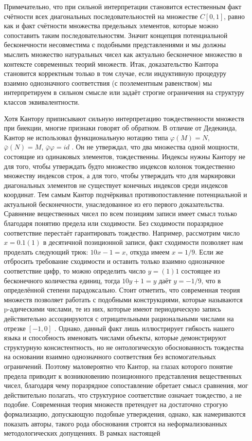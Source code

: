\documentclass[12pt]{article}
\begin{document}
Примечательно, что при сильной интерпретации становится естественным факт счётности всех диагональных последовательностей на множестве $C[0, 1]$, равно как и факт счётности множества предельных элементов, которые можно сопоставить таким последовательностям. Значит концепция потенциальной бесконечности несовместима с подобными представлениями и мы должны мыслить множество натуральных чисел как актуально бесконечное множество в контексте современных теорий множеств. Итак, доказательство Кантора становится корректным только в том случае, если индуктивную процедуру взаимно однозначного соответствия (с поэлементным равенством) мы интерпретируем в сильном смысле или задаёт строгие ограничения на структуру классов эквивалентности.

Хотя Кантору приписывают сильную интерпретацию тождественности множеств при биекции, многие признаки говорят об обратном. В отличие от Дедекинда, Кантор не использовал функциональную нотацию типа $\varphi(M) = N$, $\bar{\varphi}(N) = M$, $\bar{\varphi}\varphi = id$ \cite{cantor-equality, dedekind-equality}. Он не утверждал, что два множества одной мощности, состоящие из одинаковых элементов, тождественны. Индексы нужны Кантору не для того, чтобы утверждать будто множество индексов колонок тождественно множеству индексов строк, а для того, чтобы утверждать что для маркировки диагональных элементов не существует конечных индексов среди индексов координат. Тем самым Кантор подчёркивал противопоставление потенциальной и актуальной бесконечности, унаследованное из его первого доказательства. Сравнение вещественных чисел по всем позициям записи имеет смысл только благодаря понятию предела или сходимости. Без сходимости поразрядное соответствие перестаёт гарантировать тождество. Например, рассмотрим число $x = 0.1(1)$ в десятичной позиционной записи, факт сходимости позволяет нам проделать следующий трюк: $10x - 1 = x$, откуда имеем $x = 1/9$. Если же отбросить требование сходимости и оставить только взаимно однозначное соответствие цифр, то можно определить число $y = (1)1$ состоящее из бесконечного количества единиц, тогда $10y + 1 = y$ даёт $y = -1/9$, что в определённой степени парадоксально. Стоит отметить, что современная теория множеств позволяет работать с подобными конструкциями, которые называются p-адическими числами, те из них, которые имеют периодическую запись действительно ассоциируются с отрицательными рациональными числами на отрезке $[-1, 0]$ \cite{koblitz-p-adic}. Однако, данный факт лишь иллюстрирует гибкость нашего языка и способность именовать числами объекты, которые демонстрируют структурную консистентность, но не онтологическую обоснованность тождества на основании взаимно однозначного соответствия без вспомогательных ограничений. Поэтому маловероятно что Кантор, на глазах которого понятие предела приводит к возникновению позиционного представления вещественных чисел, благодаря чему поразрядное сопоставление обретает смысл сравнения, мог действительно полагать, что структурное соответствие означает тождество, а не подобие. Современная теория множеств претендует на достаточно строгую формализацию, допускающую подобные утверждения, однако, как намериваются показать авторы, такого рода обоснования строятся на неформализованных методологических допущениях. В рамках настоящей 
\end{document}
